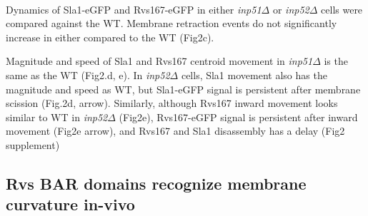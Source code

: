 \documentclass[9pt,lineno]{elife}
\begin{document}
~\\
Dynamics of Sla1-eGFP and Rvs167-eGFP in either \textit{inp51$\Delta$} or \textit{inp52$\Delta$} cells were compared against the WT. Membrane retraction events do not significantly increase in either compared to the WT (Fig2c). 

Magnitude and speed of Sla1 and Rvs167 centroid movement in \textit{inp51$\Delta$} is the same as the WT (Fig2.d, e). In \textit{inp52$\Delta$} cells, Sla1 movement also has the magnitude and speed as WT, but Sla1-eGFP signal is persistent after membrane scission (Fig.2d, arrow). Similarly, although Rvs167 inward movement looks similar to WT in \textit{inp52$\Delta$} (Fig2e), Rvs167-eGFP signal is persistent after inward movement (Fig2e arrow), and Rvs167 and Sla1 disassembly has a delay (Fig2 supplement) 






\subsection{Rvs BAR domains recognize membrane curvature in-vivo}
\end{document}

